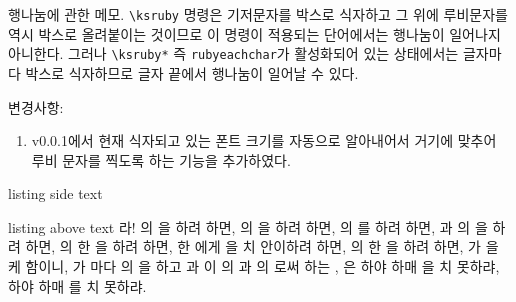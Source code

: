 \documentclass[a4paper]{oblivoir}
\begin{document}
\numpar 
행나눔에 관한 메모. \verb|\ksruby| 명령은 기저문자를 박스로 식자하고 그 위에 루비문자를 역시 박스로 올려붙이는 것이므로 이 명령이 적용되는 단어에서는 행나눔이 일어나지 아니한다.
그러나 \verb|\ksruby*| 즉 \verb|rubyeachchar|가 활성화되어 있는 상태에서는 글자마다 박스로 식자하므로 글자 끝에서 행나눔이 일어날 수 있다.

\numpar
변경사항: 
\begin{enumerate}
\item v0.0.1에서 현재 식자되고 있는 폰트 크기를 자동으로 알아내어서 거기에 맞추어 루비 문자를 찍도록 하는 기능을 추가하였다.
\end{enumerate}
\begin{tcblisting}{listing side text}
\small {}
\normalsize {}
\large {}
\Large {}
\LARGE {}
\end{tcblisting}

\newpage

\begin{tcblisting}{listing above text}
\ksrubyeachchardefault
\ksrubyextra{\color{blue!50!gray}}
라! 의 을 하려 하면,
의 을 하려 하면,
의 를 하려 하면,
과 의 을 하려 하면,
의 한 을 하려 하면,
한 에게 을 치 안이하려 하면,
의 한 을 하려 하면,
가 을 케 함이니,
가 마다 의 을 하고
과 이 의 과 의 로써 하는 ,
은 하야 하매 을 치 못하랴, 하야 하매 를 치 못하랴.
\end{tcblisting}
\end{document}
